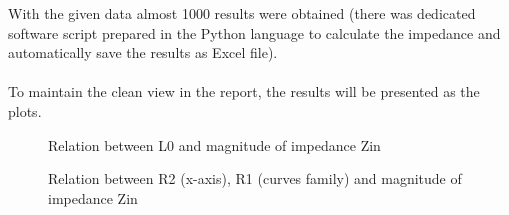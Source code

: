 \documentclass[eng,printmode]{mgr}
\begin{document}
\noindent
With the given data almost 1000 results were obtained (there was dedicated software script prepared in the Python language to calculate the impedance and automatically save the results as Excel file).
\\
\\
To maintain the clean view in the report, the results will be presented as the plots.
\begin{figure}[!h]
	\centering
	\caption{Relation between L0 and magnitude of impedance Zin}
	\label{fig:figure1}
	\centering
	\vspace{30pt}
	\caption{Relation between R2 (x-axis), R1 (curves family) and magnitude of impedance Zin}
		\vspace{30pt}
	\centering

\end{figure}
\end{document}

